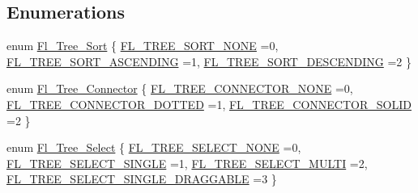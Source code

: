 \subsection*{Enumerations}
\begin{DoxyCompactItemize}
\item 
enum \hyperlink{_fl___tree___prefs_8_h_a4f5f2e1d9c7cb11a030745f591a837b0}{Fl\+\_\+\+Tree\+\_\+\+Sort} \{ \hyperlink{_fl___tree___prefs_8_h_a4f5f2e1d9c7cb11a030745f591a837b0af7b5ea8b69d18da8ba73edb078c43952}{F\+L\+\_\+\+T\+R\+E\+E\+\_\+\+S\+O\+R\+T\+\_\+\+N\+O\+NE} =0, 
\hyperlink{_fl___tree___prefs_8_h_a4f5f2e1d9c7cb11a030745f591a837b0a08b65c4965c971c1cac28c3590d3116e}{F\+L\+\_\+\+T\+R\+E\+E\+\_\+\+S\+O\+R\+T\+\_\+\+A\+S\+C\+E\+N\+D\+I\+NG} =1, 
\hyperlink{_fl___tree___prefs_8_h_a4f5f2e1d9c7cb11a030745f591a837b0a10670c639c97b0fa0fc69acc298f5fe7}{F\+L\+\_\+\+T\+R\+E\+E\+\_\+\+S\+O\+R\+T\+\_\+\+D\+E\+S\+C\+E\+N\+D\+I\+NG} =2
 \}
\item 
enum \hyperlink{_fl___tree___prefs_8_h_a1d7f7aa31541d6792802549a830af79a}{Fl\+\_\+\+Tree\+\_\+\+Connector} \{ \hyperlink{_fl___tree___prefs_8_h_a1d7f7aa31541d6792802549a830af79aaa4f4a47bd9ac74fc696f14de797bb13b}{F\+L\+\_\+\+T\+R\+E\+E\+\_\+\+C\+O\+N\+N\+E\+C\+T\+O\+R\+\_\+\+N\+O\+NE} =0, 
\hyperlink{_fl___tree___prefs_8_h_a1d7f7aa31541d6792802549a830af79aaa87a4469314fbff83557eeae519bea7f}{F\+L\+\_\+\+T\+R\+E\+E\+\_\+\+C\+O\+N\+N\+E\+C\+T\+O\+R\+\_\+\+D\+O\+T\+T\+ED} =1, 
\hyperlink{_fl___tree___prefs_8_h_a1d7f7aa31541d6792802549a830af79aa98aaf2a1309595f2a20bf92388c11310}{F\+L\+\_\+\+T\+R\+E\+E\+\_\+\+C\+O\+N\+N\+E\+C\+T\+O\+R\+\_\+\+S\+O\+L\+ID} =2
 \}
\item 
enum \hyperlink{_fl___tree___prefs_8_h_acad7b470528c2b1d8461b1766395c97d}{Fl\+\_\+\+Tree\+\_\+\+Select} \{ \hyperlink{_fl___tree___prefs_8_h_acad7b470528c2b1d8461b1766395c97da7b469d52c3e520fcee887f69b9877eeb}{F\+L\+\_\+\+T\+R\+E\+E\+\_\+\+S\+E\+L\+E\+C\+T\+\_\+\+N\+O\+NE} =0, 
\hyperlink{_fl___tree___prefs_8_h_acad7b470528c2b1d8461b1766395c97dac098344a6ad961c18500034119f7f0ec}{F\+L\+\_\+\+T\+R\+E\+E\+\_\+\+S\+E\+L\+E\+C\+T\+\_\+\+S\+I\+N\+G\+LE} =1, 
\hyperlink{_fl___tree___prefs_8_h_acad7b470528c2b1d8461b1766395c97daac8e9c6035badec27ccc1f0b8598dc22}{F\+L\+\_\+\+T\+R\+E\+E\+\_\+\+S\+E\+L\+E\+C\+T\+\_\+\+M\+U\+L\+TI} =2, 
\hyperlink{_fl___tree___prefs_8_h_acad7b470528c2b1d8461b1766395c97dae04b7378185bc968d2103bf26abadcae}{F\+L\+\_\+\+T\+R\+E\+E\+\_\+\+S\+E\+L\+E\+C\+T\+\_\+\+S\+I\+N\+G\+L\+E\+\_\+\+D\+R\+A\+G\+G\+A\+B\+LE} =3
 \}
\end{DoxyCompactItemize}


